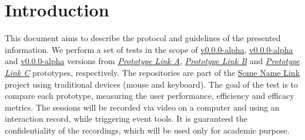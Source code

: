 
\section{Introduction}
\label{sec:sec001}

This document aims to describe the protocol and guidelines of the presented information. We perform a set of tests in the scope of \hyperlink{}{v0.0.0-alpha}, \hyperlink{}{v0.0.0-alpha} and \hyperlink{}{v0.0.0-alpha} versions from {\it \hyperlink{}{Prototype Link A}}, {\it \hyperlink{}{Prototype Link B}} and {\it \hyperlink{}{Prototype Link C}} prototypes, respectively. The repositories are part of the \hyperlink{}{Some Name Link} project using traditional devices (mouse and keyboard). The goal of the test is to compare each prototype, measuring the user performance, efficiency and efficacy metrics. The sessions will be recorded via video on a computer and using an interaction record, while triggering event tools. It is guaranteed the confidentiality of the recordings, which will be used only for academic purpose.